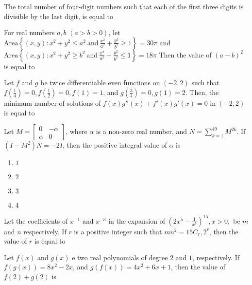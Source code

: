 \item The total number of four-digit numbers such that each of the first three digits is divisible by the last digit, is equal to 
\item For real numbers $a, b$ $(a > b > 0)$, let $ \text{Area}\left\{ (x, y) : x^2 + y^2 \leq a^2 \ \text{and} \ \frac{x^2}{a^2} + \frac{y^2}{b^2} \geq 1 \right\} = 30\pi $ and $ \text{Area}\left\{ (x, y) : x^2 + y^2 \geq b^2 \ \text{and} \ \frac{x^2}{a^2} + \frac{y^2}{b^2} \leq 1 \right\} = 18\pi $ Then the value of $(a - b)^2$ is equal to
\item Let $f$ and $g$ be twice differentiable even functions on $(-2,2)$ such that $f\left(\frac{1}{4}\right) = 0, f\left(\frac{1}{2}\right) = 0, f(1) = 1$, and $g\left(\frac{3}{4}\right) = 0, g(1) = 2$. Then, the minimum number of solutions of $f(x) g''(x) + f'(x) g'(x) = 0$ in $(-2,2)$ is equal to
\item Let $M = \begin{bmatrix} 0 & -\alpha \\ \alpha & 0 \end{bmatrix}$, where $\alpha$ is a non-zero real number, and $N = \sum_{k=1}^{49} M^{2k}$. If $(I - M^2)N = -2I$, then the positive integral value of $\alpha$ is
\begin{enumerate}
    \item $1$
    \item $2$
    \item $3$
    \item $4$
\end{enumerate}
\item Let the coefficients of $x^{-1}$ and $x^{-3}$ in the expansion of $\left( 2x^5 - \frac{1}{x^5} \right)^{15}, x > 0,$ be $m$ and $n$ respectively. If $r$ is a positive integer such that $mn^2 = {15}C_r, 2^r$, then the value of $r$ is equal to
\item Let $f(x)$ and $g(x)$ e two real polynomials of degree $2$ and $1$, respectively. If $f(g(x)) = 8x^2 - 2x$, and $g(f(x)) = 4x^2 + 6x + 1$, then the value of $f(2) + g(2)$ is

